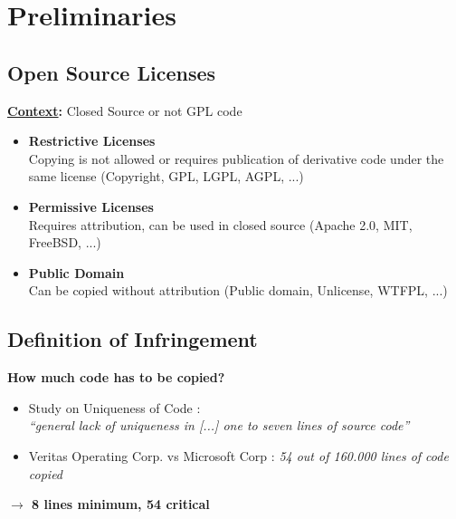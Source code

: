 
\section{Preliminaries}
\subsection{Open Source Licenses}
\begin{frame}{\insertsubsection}
	\textbf{\underline{Context}:} Closed Source or not GPL code
	
	\begin{itemize}
		\item \textbf{Restrictive Licenses}\\
			{\footnotesize Copying is not allowed or requires publication of derivative code under the same license (Copyright, GPL, LGPL, AGPL, ...)}
		\item \textbf{Permissive Licenses}\\
			{\footnotesize Requires attribution, can be used in closed source (Apache 2.0, MIT, FreeBSD, ...)}
		\item \textbf{Public Domain}\\
			{\footnotesize Can be copied without attribution (Public domain, Unlicense, WTFPL, ...)}
	\end{itemize}
\end{frame}



\subsection{Definition of Infringement}
\begin{frame}{\insertsubsection}
	\textbf{How much code has to be copied?}
	\begin{itemize}
		\item Study on Uniqueness of Code \cite{2010-gabel-su-source-code-uniqueness}:\\
			\textit{\enquote{general lack of uniqueness in [...] one to seven lines of source code}}
		\item Veritas Operating Corp. vs Microsoft Corp \cite{mertzel2008copying}:
			\textit{54 out of 160.000 lines of code copied}
	\end{itemize}
	\pause
	\begin{center}
		\textbf{$\rightarrow$ 8 lines minimum, 54 critical}
	\end{center}
\end{frame}

